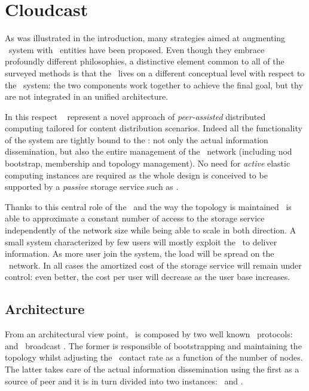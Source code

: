 \chapter{Cloudcast}

As was illustrated in the introduction, many strategies aimed at
augmenting \ptop\ system with \cloud\ entities have been
proposed. Even though they embrace profoundly different philosophies,
a distinctive element common to all of the surveyed methods
is that the \cloud\ lives on a different conceptual level with respect
to the \ptop\ system: the two components work together to achieve the
final goal, but thy are not integrated in an unified architecture.

In this respect \cloudcast\ \cite{Cloudcast} represent a novel approach
of \emph{peer-assisted} distributed computing tailored for content
distribution scenarios. Indeed all the functionality of the system are
tightly bound to the \cloud: not only the actual information
dissemination, but also the entire management of the \ptop\ network
(including nod bootstrap, membership and topology management). No need
for \emph{active} elastic computing instances are required as the
whole design is conceived to be supported by a \emph{passive} storage
service such as \amazonsss.

Thanks to this central role of the \cloud\ and the way the topology is
maintained \cloudcast\ is able to approximate a constant number of access
to the storage service independently of the network size while
being able to scale in both direction. A small system characterized by
few users will mostly exploit the \cloud\ to deliver information. As
more user join the system, the load will be spread on the
\ptop\ network. In all cases the amortized cost of the storage service
will remain under control: even better, the cost per user will
decrease as the user base increases.

\section{Architecture}
From an architectural view point, \cloudcast\ is composed by two
well known \gossip\ protocols:
\peersampling\ \cite{GossipPeerSampling}
and \epidemic\ broadcast \cite{EpidemicAlgorithms}.
The former is responsible of bootstrapping and maintaining the topology
whilst adjusting the \cloud\ contact rate as a function of the number
of nodes. The latter takes care of the actual information
dissemination using the first as a source of peer and it is in turn
divided into two instances: \antientropy\ and \rumormongering.

